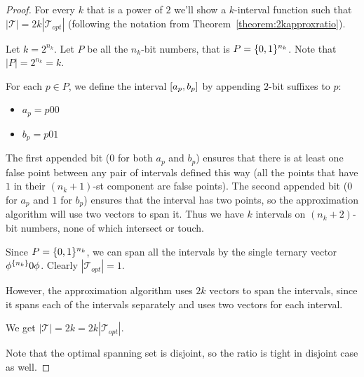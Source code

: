 \begin{proof}
For every $k$ that is a power of $2$
we'll show a $k$-interval function such that
$|\mathcal{T}| = 2k |\mathcal{T}_{opt}|$
(following the notation from
Theorem~\ref{theorem:2kapproxratio}).

Let $k = 2^{n_k}$.
Let $P$ be all the $n_k$-bit numbers,
that is $P = \{0, 1\}^{n_k}$.
Note that $|P| = 2^{n_k} = k$.

For each $p \in P$,
we define the interval $[a_p, b_p]$
by appending $2$-bit suffixes to $p$:

\begin{itemize}
\item $a_p = p 0 0$
\item $b_p = p 0 1$
\end{itemize}

The first appended bit ($0$ for both $a_p$ and $b_p$)
ensures that there is at least one false point
between any pair of intervals defined this way
(all the points that have $1$ in their $(n_k + 1)$-st
component are false points).
The second appended bit ($0$ for $a_p$ and $1$ for $b_p$)
ensures that the interval has two points,
so the approximation algorithm will use two vectors
to span it.
Thus we have $k$ intervals
on $(n_k + 2)$-bit numbers,
none of which intersect or touch.

Since $P = \{0, 1\}^{n_k}$,
we can span all the intervals by the single ternary vector
$\phi^{\{n_k\}} 0 \phi$.
Clearly $|\mathcal{T}_{opt}| = 1$.

However,
the approximation algorithm uses $2k$ vectors to span
the intervals,
since it spans each of the intervals separately
and uses two vectors for each interval.

We get
$|\mathcal{T}| = 2k = 2k |\mathcal{T}_{opt}|$.

Note that the optimal spanning set is disjoint,
so the ratio is tight in disjoint case as well.
\end{proof}
